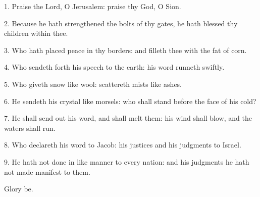 1. Praise the Lord, O Jerusalem: praise thy God, O Sion.

2. Because he hath strengthened the bolts of thy gates, he hath blessed thy children within thee.

3. Who hath placed peace in thy borders: and filleth thee with the fat of corn.

4. Who sendeth forth his speech to the earth: his word runneth swiftly.

5. Who giveth snow like wool: scattereth mists like ashes.

6. He sendeth his crystal like morsels: who shall stand before the face of his cold?

7. He shall send out his word, and shall melt them: his wind shall blow, and the waters shall run.

8. Who declareth his word to Jacob: his justices and his judgments to Israel.

9. He hath not done in like manner to every nation: and his judgments he hath not made manifest to them.

Glory be.